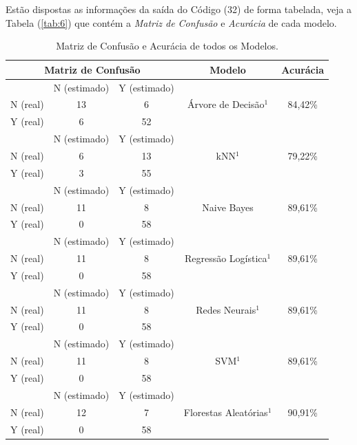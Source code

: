 \documentclass[a4paper,12pt]{article} %
\begin{document}
Estão dispostas as informações da saída do Código (32) de forma tabelada, veja a Tabela (\ref{tab:6}) que contém a \textit{Matriz de Confusão} e \textit{Acurácia} de cada modelo.
\begin{table}[H]
    \centering
    \caption{Matriz de Confusão e Acurácia de todos os Modelos.} 
    \begin{tabular}{ccc|c|c} \\ \hline
         \multicolumn{3}{c|}{Matriz de Confusão} & Modelo & Acurácia \\\hline
         & N (estimado) & Y (estimado) & \multirow{3}{*}{Árvore de Decisão$^1$} & \multirow{3}{*}{84,42\%} \\
         N (real) & 13 & 6 &  & \\
         Y (real) & 6 & 52 &  & \\ \hline
         & N (estimado) & Y (estimado) & \multirow{3}{*}{kNN$^1$} & \multirow{3}{*}{79,22\%}\\
         N (real) & 6 & 13 &  & \\
         Y (real) & 3 & 55 &  & \\ \hline
         & N (estimado) & Y (estimado) & \multirow{3}{*}{Naive Bayes} & \multirow{3}{*}{89,61\%}\\
         N (real) & 11 & 8 &  & \\
         Y (real) & 0 & 58 &  & \\ \hline
         & N (estimado) & Y (estimado) & \multirow{3}{*}{Regressão Logística$^1$} & \multirow{3}{*}{89,61\%}\\
         N (real) & 11 & 8 &  & \\
         Y (real) & 0 & 58 &  & \\  \hline
         & N (estimado) & Y (estimado) & \multirow{3}{*}{Redes Neurais$^1$} & \multirow{3}{*}{89,61\%}\\
         N (real) & 11 & 8 &  & \\
         Y (real) & 0 & 58 &  & \\ \hline
         & N (estimado) & Y (estimado) & \multirow{3}{*}{SVM$^1$} & \multirow{3}{*}{89,61\%}\\
         N (real) & 11 & 8 &  & \\
         Y (real) & 0 & 58 &  & \\ \hline
         & N (estimado) & Y (estimado) & \multirow{3}{*}{Florestas Aleatórias$^1$} & \multirow{3}{*}{90,91\%}\\
         N (real) & 12 & 7 &  & \\
         Y (real) & 0 & 58 &  & \\ \hline

\end{tabular}
\end{table}
\end{document}

